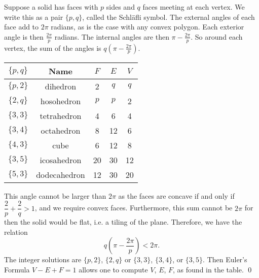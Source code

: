 \pf Suppose a solid has faces with $p$ sides and $q$ faces meeting at each vertex. We write this as a pair $\{p,q\}$, called the Schl\"afli symbol. The external angles of each face add to $2\pi$ radians, as is the case with any convex polygon. Each exterior angle is then $\frac{2\pi}{p}$ radians. The internal angles are then $\pi - \frac{2\pi}{p}$. So around each vertex, the sum of the angles is $q(\pi - \frac{2\pi}{p})$. 
	\begin{table}[h]
	\centering
	\begin{tabular}{ccccc}
	$\{p,q\}$ & Name & $F$ & $E$ & $V$ \\ \hline
	$\{p,2\}$ & dihedron & 2 & $q$ & $q$ \\
	$\{2,q\}$ & hosohedron & $p$ & $p$ & 2 \\
	$\{3,3\}$ & tetrahedron & 4 & 6 & 4 \\
	$\{3,4\}$ & octahedron & 8 & 12 & 6 \\
	$\{4,3\}$ & cube & 6 & 12 & 8 \\
	$\{3,5\}$ & icosahedron & 20 & 30 & 12 \\
	$\{5,3\}$ & dodecahedron & 12 & 30 & 20
	\end{tabular}
	\end{table}
This angle cannot be larger than $2\pi$ as the faces are concave if and only if $\dfrac{2}{p} + \dfrac{2}{q}>1$, and we require convex faces. Furthermore, this sum cannot be $2\pi$ for then the solid would be flat, i.e. a tiling of the plane. Therefore, we have the relation
	\[
	q \left( \pi - \dfrac{2\pi}{p}\right)< 2\pi.
	\]
The integer solutions are $\{p,2\}$, $\{2,q\}$ or $\{3,3\}$, $\{3,4\}$, or $\{3,5\}$. Then Euler's Formula $V-E+F=1$ allows one to compute $V$, $E$, $F$, as found in the table. \qed \\


